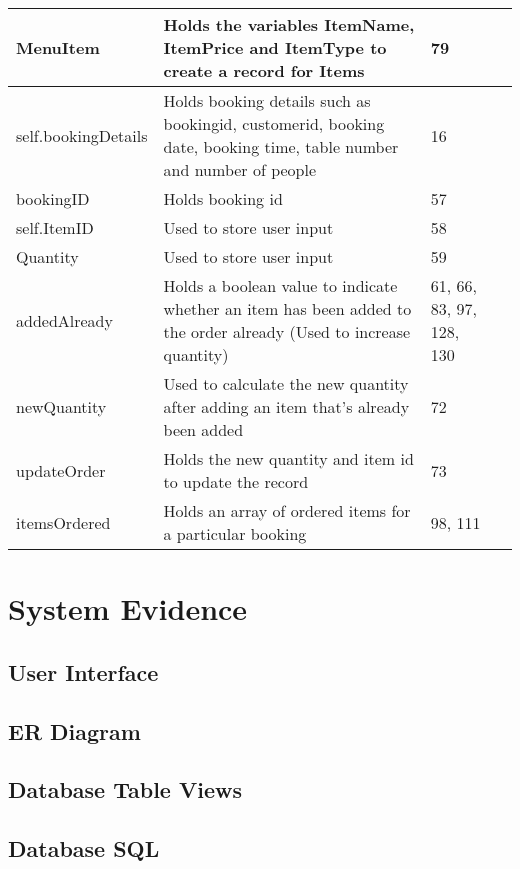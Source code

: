 \begin{center}
\begin{longtable}{|p{3cm}|p{4.5cm}|p{3cm}|p{1cm}|}
MenuItem & Holds the variables ItemName, ItemPrice and ItemType to create a record for Items & 79 & \\ \hline
self.bookingDetails & Holds booking details such as bookingid, customerid, booking date, booking time, table number and number of people & 16& \\ \hline
bookingID & Holds booking id & 57 & \\ \hline
self.ItemID & Used to store user input & 58 & \\ \hline
Quantity & Used to store user input & 59 & \\ \hline
addedAlready & Holds a boolean value to indicate whether an item has been added to the order already (Used to increase quantity) & 61, 66, 83, 97, 128, 130 & \\ \hline
newQuantity & Used to calculate the new quantity after adding an item that's already been added & 72 & \\ \hline
updateOrder & Holds the new quantity and item id to update the record & 73 & \\ \hline
itemsOrdered & Holds an array of ordered items for a particular booking & 98, 111& \\ \hline





\end{longtable}
\end{center}

\section{System Evidence}

\subsection{User Interface}

\subsection{ER Diagram}

\subsection{Database Table Views}

\subsection{Database SQL}

